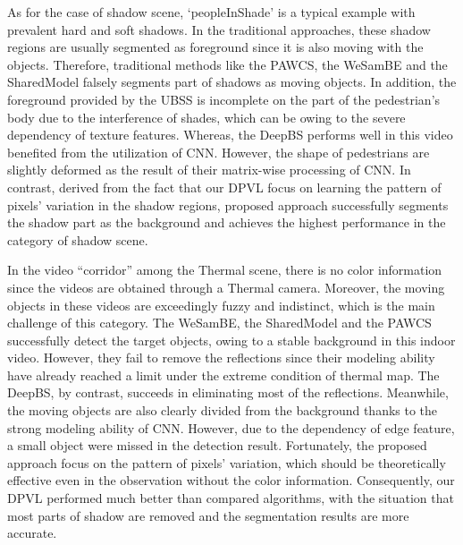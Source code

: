 \documentclass[runningheads,a4paper]{llncs}
\begin{document}
As for the case of shadow scene, ‘peopleInShade’ is a typical example with prevalent hard and soft shadows. In the traditional approaches, these shadow regions are usually segmented as foreground since it is also moving with the objects. Therefore, traditional methods like the PAWCS, the WeSamBE and the SharedModel falsely segments part of shadows as moving objects. In addition, the foreground provided by the UBSS is incomplete on the part of the pedestrian’s body due to the interference of shades, which can be owing to the severe dependency of texture features. Whereas, the DeepBS performs well in this video benefited from the utilization of CNN. However, the shape of pedestrians are slightly deformed as the result of their matrix-wise processing of CNN. In contrast, derived from the fact that our DPVL focus on learning the pattern of pixels’ variation in the shadow regions, proposed approach successfully segments the shadow part as the background and achieves the highest performance in the category of shadow scene.

In the video “corridor” among the Thermal scene, there is no color information since the videos are obtained through a Thermal camera. Moreover, the moving objects in these videos are exceedingly fuzzy and indistinct, which is the main challenge of this category. The WeSamBE, the SharedModel and the PAWCS successfully detect the target objects, owing to a stable background in this indoor video. However, they fail to remove the reflections since their modeling ability have already reached a limit under the extreme condition of thermal map. The DeepBS, by contrast, succeeds in eliminating most of the reflections. Meanwhile, the moving objects are also clearly divided from the background thanks to the strong modeling ability of CNN. However, due to the dependency of edge feature, a small object were missed in the detection result. Fortunately, the proposed approach focus on the pattern of pixels’ variation, which should be theoretically effective even in the observation without the color information. Consequently, our DPVL performed much better than compared algorithms, with the situation that most parts of shadow are removed and the segmentation results are more accurate.
\end{document}

